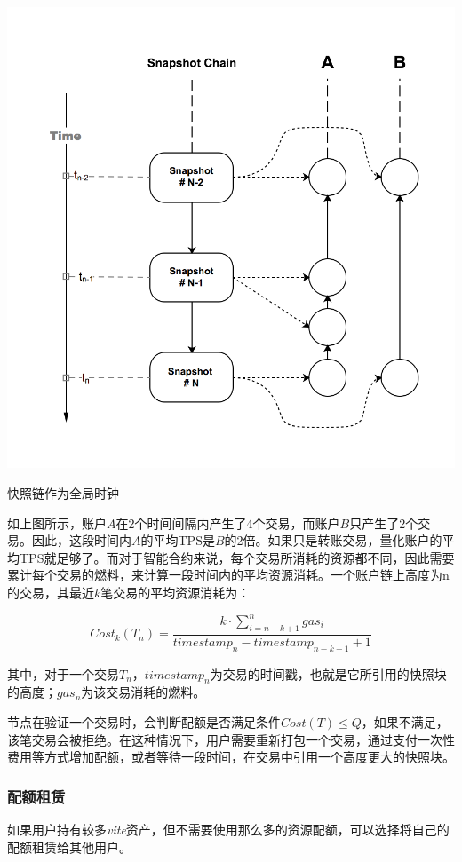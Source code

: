 \documentclass[UTF8,nofonts]{ctexart}
\makeatletter
\newenvironment{figurehere}
 {\def\@captype{figure}}
 {}
\makeatother
\begin{document}
\begin{multicols}{2}
\begin{center}
\begin{figurehere}
\includegraphics[width=.8\linewidth]{image/snapshotchain-clock.png}
\caption{快照链作为全局时钟}
\end{figurehere}
\end{center}

如上图所示，账户$A$在2个时间间隔内产生了4个交易，而账户$B$只产生了2个交易。因此，这段时间内$A$的平均TPS是$B$的2倍。如果只是转账交易，量化账户的平均TPS就足够了。而对于智能合约来说，每个交易所消耗的资源都不同，因此需要累计每个交易的燃料，来计算一段时间内的平均资源消耗。一个账户链上高度为n的交易，其最近$k$笔交易的平均资源消耗为：

\begin{equation}
Cost_{k}(T_n) = \frac{k \cdot \sum_{i=n-k+1}^{n}gas_{i}}{timestamp_{n} - timestamp_{n-k+1} + 1} 
\end{equation}

其中，对于一个交易$T_n$，$timestamp_n$为交易的时间戳，也就是它所引用的快照块的高度；$gas_n$为该交易消耗的燃料。

节点在验证一个交易时，会判断配额是否满足条件$Cost(T) \leq Q$，如果不满足，该笔交易会被拒绝。在这种情况下，用户需要重新打包一个交易，通过支付一次性费用等方式增加配额，或者等待一段时间，在交易中引用一个高度更大的快照块。

\subsubsection{配额租赁}
如果用户持有较多\textit{vite}资产，但不需要使用那么多的资源配额，可以选择将自己的配额租赁给其他用户。


\end{multicols}
\end{document}
